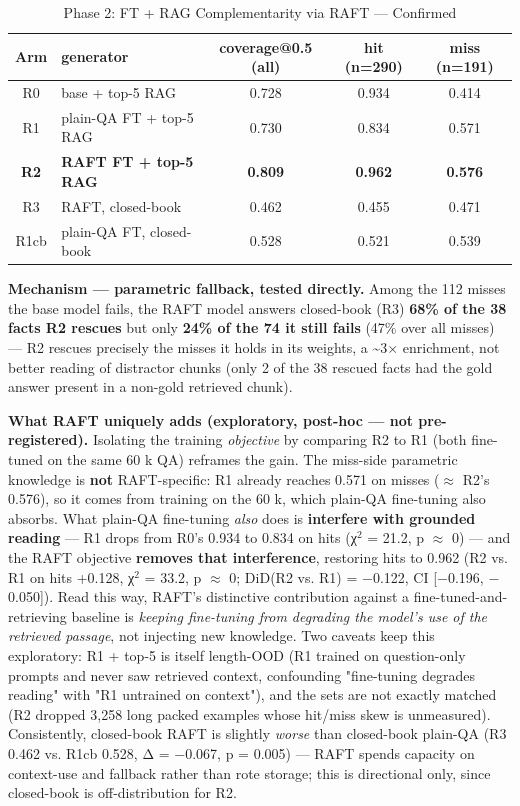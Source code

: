 \documentclass[10pt,twocolumn]{article}
\begin{document}
\begin{table}[htbp]
  \centering\small
  \caption{Phase 2: FT + RAG Complementarity via RAFT --- Confirmed}
  \label{tab:phase-2-ft-rag-complementarity-via-raft-confirmed}
  \begin{tabularx}{\textwidth}{cLccc}
  \toprule
    Arm & generator & coverage@0.5 (all) & hit (n=290) & miss (n=191) \\
  \midrule
  \midrule
  R0 & base + top-5 RAG & 0.728 & 0.934 & 0.414 \\
  R1 & plain-QA FT + top-5 RAG & 0.730 & 0.834 & 0.571 \\
  \textbf{R2} & \textbf{RAFT FT + top-5 RAG} & \textbf{0.809} & \textbf{0.962} & \textbf{0.576} \\
  R3 & RAFT, closed-book & 0.462 & 0.455 & 0.471 \\
  R1cb & plain-QA FT, closed-book & 0.528 & 0.521 & 0.539 \\
  \bottomrule
  \end{tabularx}
\end{table}


\textbf{Mechanism --- parametric fallback, tested directly.} Among the 112 misses the base model fails, the RAFT model answers closed-book (R3) \textbf{68\% of the 38 facts R2 rescues} but only \textbf{24\% of the 74 it still fails} (47\% over all misses) --- R2 rescues precisely the misses it holds in its weights, a \textasciitilde{}3$\times$ enrichment, not better reading of distractor chunks (only 2 of the 38 rescued facts had the gold answer present in a non-gold retrieved chunk).


\textbf{What RAFT uniquely adds (exploratory, post-hoc --- not pre-registered).} Isolating the training \textit{objective} by comparing R2 to R1 (both fine-tuned on the same 60 k QA) reframes the gain. The miss-side parametric knowledge is \textbf{not} RAFT-specific: R1 already reaches 0.571 on misses ($\approx$ R2's 0.576), so it comes from training on the 60 k, which plain-QA fine-tuning also absorbs. What plain-QA fine-tuning \textit{also} does is \textbf{interfere with grounded reading} --- R1 drops from R0's 0.934 to 0.834 on hits (χ$^2$ = 21.2, p $\approx$ 0) --- and the RAFT objective \textbf{removes that interference}, restoring hits to 0.962 (R2 vs. R1 on hits +0.128, χ$^2$ = 33.2, p $\approx$ 0; DiD(R2 vs. R1) = $-$0.122, CI [$-$0.196, $-$0.050]). Read this way, RAFT's distinctive contribution against a fine-tuned-and-retrieving baseline is \textit{keeping fine-tuning from degrading the model's use of the retrieved passage}, not injecting new knowledge. Two caveats keep this exploratory: R1 + top-5 is itself length-OOD (R1 trained on question-only prompts and never saw retrieved context, confounding "fine-tuning degrades reading" with "R1 untrained on context"), and the sets are not exactly matched (R2 dropped 3,258 long packed examples whose hit/miss skew is unmeasured). Consistently, closed-book RAFT is slightly \textit{worse} than closed-book plain-QA (R3 0.462 vs. R1cb 0.528, Δ = $-$0.067, p = 0.005) --- RAFT spends capacity on context-use and fallback rather than rote storage; this is directional only, since closed-book is off-distribution for R2.
\end{document}
